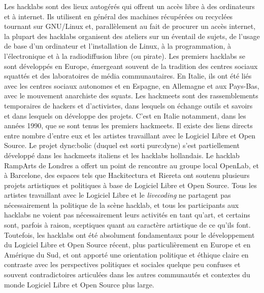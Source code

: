 {Les hacklabs sont des lieux autog\'er\'es qui offrent un acc\`es libre
\`a des ordinateurs et \`a internet. Ils utilisent en g\'en\'eral des
machines r\'ecup\'er\'ees ou recycl\'ees tournant sur GNU/Linux et,
parall\`element au fait de procurer un acc\`es internet, la plupart des
hacklabs organisent des ateliers sur un \'eventail de sujets, de
l'usage de base d'un ordinateur et l'installation de Linux, \`a la
programmation, \`a l'\'electronique et \`a la radiodiffusion libre (ou
pirate). Les premiers hacklabs se sont d\'evelopp\'es en Europe,
\'emergeant souvent de la tradition des centres sociaux squatt\'es et
des laboratoires de m\'edia communautaires. En Italie, ils ont \'et\'e
li\'es avec les centres sociaux autonomes et en Espagne, en Allemagne
et aux Pays{}-Bas, avec le mouvement anarchiste des squats. Les
hackmeets sont des rassemblements temporaires de hackers et
d'activistes, dans lesquels on \'echange outils et savoirs et dans
lesquels on d\'eveloppe des projets. C'est en Italie notamment, dans
les ann\'ees 1990, que se sont tenus les premiers hackmeets. Il existe
des liens directs entre nombre d'entre eux et les artistes travaillant
avec le Logiciel Libre et Open Source. Le projet dyne:bolic (duquel est
sorti pure:dyne) s'est partiellement d\'evelopp\'e dans les hackmeets
italiens et les hacklabs hollandais. Le hacklab RampArts de Londres a
offert un point de rencontre au groupe local OpenLab, et \`a Barcelone,
des espaces tels que Hackitectura et Riereta ont soutenu plusieurs
projets artistiques et politiques \`a base de Logiciel Libre et Open
Source. Tous les artistes travaillant avec le Logiciel Libre et le
{\em livecoding} ne partagent pas n\'ecessairement la politique de
la sc\`ene hacklab, et tous les participants aux hacklabs ne voient pas
n\'ecessairement leurs activit\'es en tant qu'art, et certains sont,
parfois \`a raison, sceptiques quant au caract\`ere artistique de ce
qu'ils font. Toutefois, les hacklabs ont \'et\'e absolument
fondamentaux pour le d\'eveloppement du Logiciel Libre et Open Source
r\'ecent, plus particuli\`erement en Europe et en Am\'erique du Sud, et
ont apport\'e une orientation politique et \'ethique claire en
contraste avec les perspectives politiques et sociales quelque peu
confuses et souvent contradictoires articul\'ees dans les autres
communaut\'es et contextes du monde Logiciel Libre et Open Source plus
large.

}
